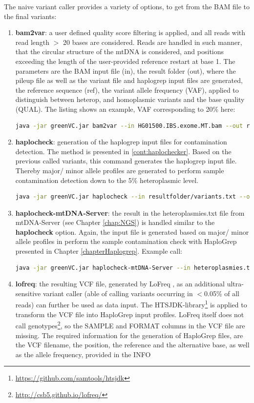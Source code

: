 The naive variant caller provides a variety of options, to get from the BAM file to the final variants:
\begin{enumerate}
\item \textbf{bam2var}: a user defined quality score filtering is applied, and all reads with read length $>$ 20 bases are considered. Reads are handled in such manner, that the circular structure of the mtDNA is considered, and positions exceeding the length of the user-provided reference restart at base 1. 
The parameters are the BAM input file (in), the result folder (out), where the pileup file as well as the variant file and haplogrep input files are generated, the reference sequence (ref), the variant allele frequency (VAF), applied to distinguish between heterop, and homoplasmic variants and the base quality (QUAL). The listing shows an example, VAF corresponding to 20\% here:
\begin{lstlisting}[language=bash]
java -jar greenVC.jar bam2var --in HG01500.IBS.exome.MT.bam --out resultfolder  --ref data/rcrs.fasta  --VAF 0.2 --QUAL 20
\end{lstlisting}
\item \textbf{haplocheck}: generation of the haplogrep input files for contamination detection. The method is presented in \ref{cont:haplochecker}. Based on the previous called variants, this command generates the haplogrep input file. Thereby major/ minor allele profiles are generated to perform sample contamination detection down to the 5\% heteroplasmic level.
\begin{lstlisting}[language=bash]
java -jar greenVC.jar haplocheck --in resultfolder/variants.txt --out haplogrepinput.hsd   --VAF 0.05 
\end{lstlisting}
\item \textbf{haplocheck-mtDNA-Server}: the result in the heteroplasmies.txt file from mtDNA-Server (see Chapter \ref{chap:NGS}) is handled similar to the \textbf{haplocheck} option. Again, the input file is generated based on major/ minor allele profiles in perform the sample contamination check with HaploGrep presented in Chapter \ref{chapterHaplogrep}. Example call:
\begin{lstlisting}[language=bash]
java -jar greenVC.jar haplocheck-mtDNA-Server --in heteroplasmies.txt --out haplogrepinput.hsd  --VAF 0.05 
\end{lstlisting}
\item \textbf{lofreq}: the resulting VCF file, generated by LoFreq \cite{Wilm2012}, as an additional ultra-sensitive variant caller (able of calling variants occurring in $<$0.05\% of all reads) can further be used as data input. The HTSJDK-library\footnote{\url{https://github.com/samtools/htsjdk}} is applied to transform the VCF file into HaploGrep input profiles. LoFreq itself does not call genotypes\footnote{\url{http://csb5.github.io/lofreq/}}, so the SAMPLE and FORMAT columns in the VCF file are missing. The required information for the generation of HaploGrep files, are the VCF filename, the position, the reference and the alternative base, as well as the allele frequency, provided in the INFO

\end{enumerate}
